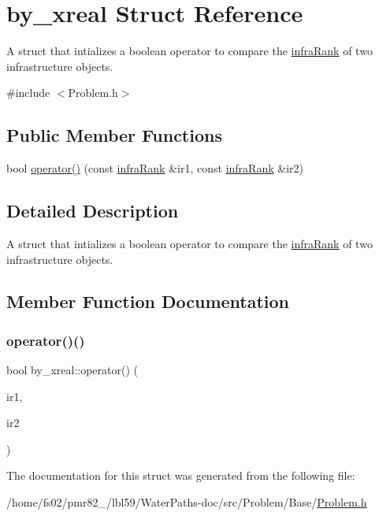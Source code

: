 \hypertarget{structby__xreal}{}\section{by\+\_\+xreal Struct Reference}
\label{structby__xreal}


A struct that intializes a boolean operator to compare the \mbox{\hyperlink{structinfraRank}{infra\+Rank}} of two infrastructure objects.  




{\ttfamily \#include $<$Problem.\+h$>$}

\subsection*{Public Member Functions}
\begin{DoxyCompactItemize}
\item 
bool \mbox{\hyperlink{structby__xreal_a89543fd1eb21d028c20e4cd01a239b71}{operator()}} (const \mbox{\hyperlink{structinfraRank}{infra\+Rank}} \&ir1, const \mbox{\hyperlink{structinfraRank}{infra\+Rank}} \&ir2)
\end{DoxyCompactItemize}


\subsection{Detailed Description}
A struct that intializes a boolean operator to compare the \mbox{\hyperlink{structinfraRank}{infra\+Rank}} of two infrastructure objects. 

\subsection{Member Function Documentation}
\mbox{\label{structby__xreal_a89543fd1eb21d028c20e4cd01a239b71}} 
\subsubsection{\texorpdfstring{operator()()}{operator()()}}
{\footnotesize\ttfamily bool by\+\_\+xreal\+::operator() (\begin{DoxyParamCaption}\item[{const \mbox{\hyperlink{structinfraRank}{infra\+Rank}} \&}]{ir1,  }\item[{const \mbox{\hyperlink{structinfraRank}{infra\+Rank}} \&}]{ir2 }\end{DoxyParamCaption})\hspace{0.3cm}{\ttfamily [inline]}}



The documentation for this struct was generated from the following file\+:\begin{DoxyCompactItemize}
\item 
/home/fs02/pmr82\+\_/lbl59/\+Water\+Paths-\/doc/src/\+Problem/\+Base/\mbox{\hyperlink{Problem_8h}{Problem.\+h}}\end{DoxyCompactItemize}
